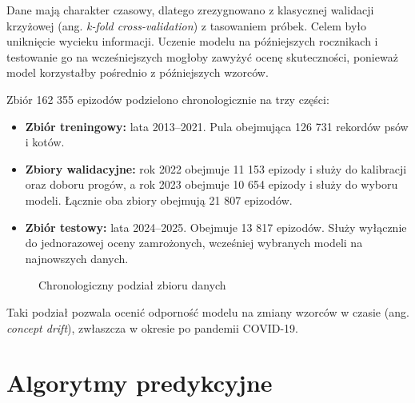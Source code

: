 Dane mają charakter czasowy, dlatego zrezygnowano z klasycznej walidacji krzyżowej (ang. \emph{k-fold cross-validation}) z tasowaniem próbek. Celem było uniknięcie wycieku informacji. Uczenie modelu na późniejszych rocznikach i testowanie go na wcześniejszych mogłoby zawyżyć ocenę skuteczności, ponieważ model korzystałby pośrednio z późniejszych wzorców.

Zbiór 162 355 epizodów podzielono chronologicznie na trzy części:

\begin{itemize}\itemsep2pt
\item \textbf{Zbiór treningowy:} lata 2013--2021. Pula obejmująca 126 731 rekordów psów i kotów.
\item \textbf{Zbiory walidacyjne:} rok 2022 obejmuje 11 153 epizody i służy do kalibracji oraz doboru progów, a rok 2023 obejmuje 10 654 epizody i służy do wyboru modeli. Łącznie oba zbiory obejmują 21 807 epizodów.
\item \textbf{Zbiór testowy:} lata 2024--2025. Obejmuje 13 817 epizodów. Służy wyłącznie do jednorazowej oceny zamrożonych, wcześniej wybranych modeli na najnowszych danych.
\end{itemize}

\begin{figure}[htbp]
\centering
{}
\caption{Chronologiczny podział zbioru danych}
\label{fig:podzial-chronologiczny}
\end{figure}

Taki podział pozwala ocenić odporność modelu na zmiany wzorców w czasie (ang. \emph{concept drift}), zwłaszcza w okresie po pandemii COVID-19.

\section{Algorytmy predykcyjne}
\label{sec:algorytmy-predykcyjne}

